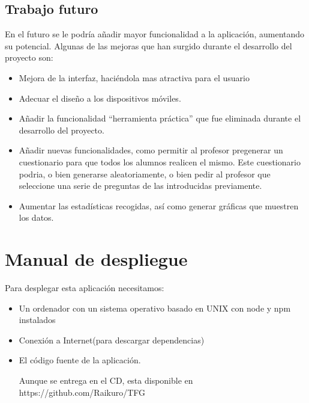 \documentclass[openright,twoside,10pt]{book}
\providecommand{\tightlist}{%
  \setlength{\itemsep}{0pt}\setlength{\parskip}{0pt}}
\begin{document}
    \section{Trabajo futuro}\label{trabajo-futuro}
    
    En el futuro se le podría añadir mayor funcionalidad a la aplicación,
    aumentando su potencial. Algunas de las mejoras que han surgido durante
    el desarrollo del proyecto son:
    
    \begin{itemize}
    \tightlist
    \item
      Mejora de la interfaz, haciéndola mas atractiva para el usuario
    \item
      Adecuar el diseño a los dispositivos móviles.
    \item
      Añadir la funcionalidad \enquote{herramienta práctica} que fue
      eliminada durante el desarrollo del proyecto.
    \item
      Añadir nuevas funcionalidades, como permitir al profesor pregenerar un
      cuestionario para que todos los alumnos realicen el mismo. Este
      cuestionario podria, o bien generarse aleatoriamente, o bien pedir al
      profesor que seleccione una serie de preguntas de las introducidas
      previamente.
    \item
      Aumentar las estadísticas recogidas, así como generar gráficas que
      muestren los datos.
    \end{itemize}
    
    \appendix
    
    \chapter{ Manual de despliegue }
    
    Para desplegar esta aplicación necesitamos:
    
    \begin{itemize}
    \item
      Un ordenador con un sistema operativo basado en UNIX con node y npm
      instalados
    \item
      Conexión a Internet(para descargar dependencias)
    \item
      El código fuente de la aplicación.
    
      Aunque se entrega en el CD, esta disponible en
      https://github.com/Raikuro/TFG
    \end{itemize}
    
\end{document}
